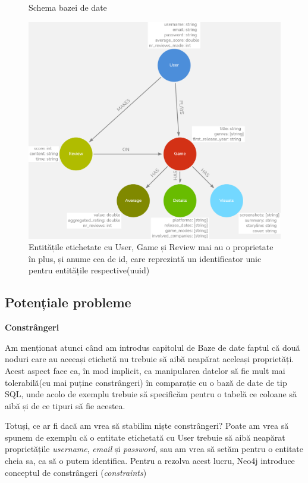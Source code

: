 \documentclass[12pt,a4paper]{report}
\begin{document}
\begin{figure}[H]
\centering
\caption{Schema bazei de date}
\begin{adjustbox}{max size={\textwidth}{\textheight}}
\includegraphics[scale=0.4]{exemplu_5_neo4j}
\end{adjustbox}
\caption*{Entitățile etichetate cu User, Game și Review mai au o proprietate în plus, și anume cea de id, care reprezintă un identificator unic pentru entitățile respective(uuid)}
\end{figure}

\subsection{Potențiale probleme}

\bigskip
\textbf{Constrângeri}
\bigskip

Am menționat atunci când am introdus capitolul de Baze de date faptul că două noduri care au aceeași etichetă nu trebuie să aibă neapărat aceleași proprietăți. Acest aspect face ca, în mod implicit, ca manipularea datelor să fie mult mai tolerabilă(cu mai puține constrângeri) în comparație cu o bază de date de tip SQL, unde acolo de exemplu trebuie să specificăm pentru o tabelă ce coloane să aibă și de ce tipuri să fie acestea.

Totuși, ce ar fi dacă am vrea să stabilim niște constrângeri? Poate am vrea să spunem de exemplu că o entitate etichetată cu User trebuie să aibă neapărat proprietățile \emph{username}, \emph{email} și \emph{password}, sau am vrea să setăm pentru o entitate cheia sa, ca să o putem identifica. Pentru a rezolva acest lucru, Neo4j introduce conceptul de constrângeri (\emph{constraints}) \cite{12}
\end{document}
